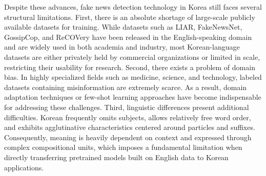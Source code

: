 \documentclass[a4paper,fleqn]{cas-sc}
\begin{document}
Despite these advances, fake news detection technology in Korea still faces several structural limitations.
First, there is an absolute shortage of large-scale publicly available datasets for training. While datasets such as LIAR, FakeNewsNet, GossipCop, and ReCOVery have been released in the English-speaking domain and are widely used in both academia and industry, most Korean-language datasets are either privately held by commercial organizations or limited in scale, restricting their usability for research.
Second, there exists a problem of domain bias. In highly specialized fields such as medicine, science, and technology, labeled datasets containing misinformation are extremely scarce. As a result, domain adaptation techniques or few-shot learning approaches have become indispensable for addressing these challenges.
Third, linguistic differences present additional difficulties. Korean frequently omits subjects, allows relatively free word order, and exhibits agglutinative characteristics centered around particles and suffixes. Consequently, meaning is heavily dependent on context and expressed through complex compositional units, which imposes a fundamental limitation when directly transferring pretrained models built on English data to Korean applications.
\end{document}

